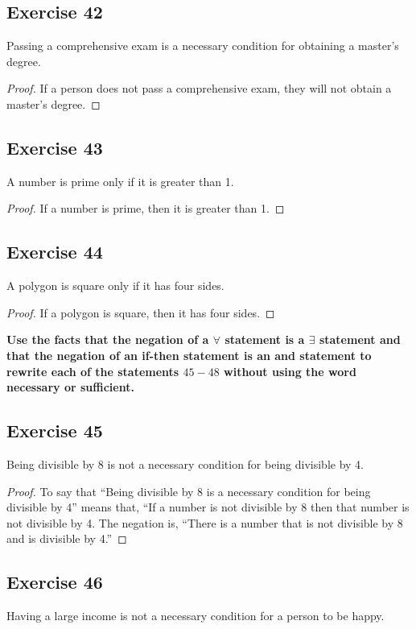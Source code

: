 \documentclass[14pt]{extarticle}
\newcommand{\fa}{\forall}
\newcommand{\te}{\exists}
\begin{document}
\subsection{Exercise 42}
Passing a comprehensive exam is a necessary condition for obtaining a master’s degree.

\begin{proof}
    If a person does not pass a comprehensive exam, they will not obtain a master's degree.
\end{proof}

\subsection{Exercise 43}
A number is prime only if it is greater than 1.

\begin{proof}
    If a number is prime, then it is greater than 1.
\end{proof}

\subsection{Exercise 44}
A polygon is square only if it has four sides.

\begin{proof}
    If a polygon is square, then it has four sides.
\end{proof}

{\bf \color{cyan} Use the facts that the negation of a $\fa$ statement is a $\te$ statement and that the negation of an if-then statement is an and statement to rewrite each of the statements $45-48$ without using the word necessary or sufficient.}

\subsection{Exercise 45}
Being divisible by 8 is not a necessary condition for being divisible by 4.

\begin{proof}
    To say that “Being divisible by 8 is a necessary condition for being divisible by 4” means that, “If a number is not divisible by 8 then that number is not divisible by 4. The negation is, “There is a number that is not divisible by 8 and is divisible by 4.”
\end{proof}

\subsection{Exercise 46}
Having a large income is not a necessary condition for a person to be happy.
\end{document}

